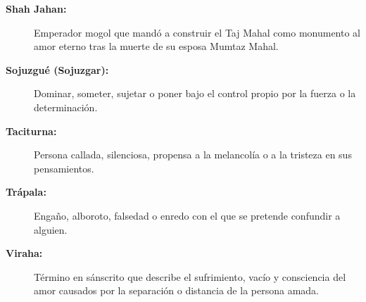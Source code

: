 \documentclass[12pt,oneside,a5paper]{book}
\begin{document}
\begin{description}
    \item[\textbf{Shah Jahan:}] Emperador mogol que mandó a construir el Taj Mahal como monumento al amor eterno tras la muerte de su esposa Mumtaz Mahal.
    \item[\textbf{Sojuzgué (Sojuzgar):}] Dominar, someter, sujetar o poner bajo el control propio por la fuerza o la determinación.
    \item[\textbf{Taciturna:}] Persona callada, silenciosa, propensa a la melancolía o a la tristeza en sus pensamientos.
    \item[\textbf{Trápala:}] Engaño, alboroto, falsedad o enredo con el que se pretende confundir a alguien.
    \item[\textbf{Viraha:}] Término en sánscrito que describe el sufrimiento, vacío y consciencia del amor causados por la separación o distancia de la persona amada.
\end{description}
\end{document}
